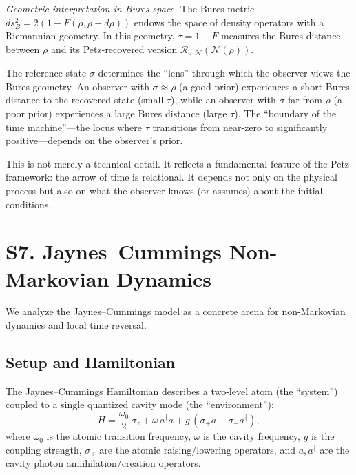 \documentclass[prl,twocolumn,superscriptaddress,longbibliography]{revtex4-2}
\newcommand{\Petz}{\mathcal{R}}
\newcommand{\chan}{\mathcal{N}}
\newcommand{\tauasym}{\tau}
\begin{document}
\emph{Geometric interpretation in Bures space.}
The Bures metric $ds_B^2 = 2(1 - F(\rho, \rho + d\rho))$ endows
the space of density operators with a Riemannian geometry.  In this
geometry, $\tauasym = 1 - F$ measures the Bures distance between
$\rho$ and its Petz-recovered version
$\Petz_{\sigma,\chan}(\chan(\rho))$.

The reference state $\sigma$ determines the ``lens'' through which the
observer views the Bures geometry.  An observer with
$\sigma \approx \rho$ (a good prior) experiences a short Bures
distance to the recovered state (small $\tauasym$), while an
observer with $\sigma$ far from $\rho$ (a poor prior) experiences
a large Bures distance (large $\tauasym$).  The ``boundary of the
time machine''---the locus where $\tauasym$ transitions from near-zero
to significantly positive---depends on the observer's prior.

This is not merely a technical detail.  It reflects a fundamental
feature of the Petz framework: the arrow of time is relational.
It depends not only on the physical process but also on what the
observer knows (or assumes) about the initial conditions.

\section{S7. Jaynes--Cummings Non-Markovian Dynamics}
\label{sec:JC}

We analyze the Jaynes--Cummings model as a concrete arena for
non-Markovian dynamics and local time reversal.

\subsection{Setup and Hamiltonian}

The Jaynes--Cummings Hamiltonian describes a two-level atom (the
``system'') coupled to a single quantized cavity mode (the
``environment''):
\begin{equation}
H = \frac{\omega_0}{2}\,\sigma_z + \omega\, a^\dagger a
+ g\,(\sigma_+ a + \sigma_- a^\dagger),
\label{eq:JC_hamiltonian}
\end{equation}
where $\omega_0$ is the atomic transition frequency, $\omega$ is the
cavity frequency, $g$ is the coupling strength, $\sigma_\pm$ are the
atomic raising/lowering operators, and $a, a^\dagger$ are the cavity
photon annihilation/creation operators.
\end{document}
